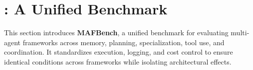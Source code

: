 \section{: A Unified Benchmark}
\label{sec:benchmark_collection}


This section introduces \textbf{MAFBench}, a unified benchmark for evaluating multi-agent frameworks across memory, planning, specialization, tool use, and coordination. It standardizes execution, logging, and cost control to ensure identical conditions across frameworks while isolating architectural effects.















